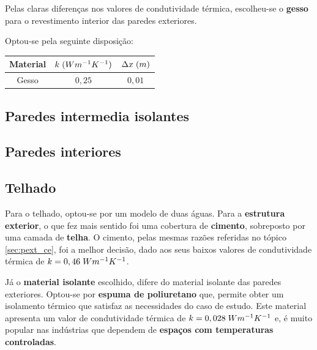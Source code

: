 \documentclass[12pt, a4paper]{article}
\begin{document}
Pelas claras diferenças nos valores de condutividade térmica, escolheu-se o \textbf{gesso} para o revestimento interior
das paredes exteriores.

Optou-se pela seguinte disposição:

\begin{center}
	\begin{tabular}{||c c c||}
		\hline
		Material & $k \hspace{1mm} (Wm^{-1}K^{-1})$ & $\Delta x \hspace{1mm} (m)$ \\ [0.5ex]
		\hline\hline
		Gesso    & $0,25$                           & $0,01$                      \\
		\hline
	\end{tabular}
\end{center}


\subsection{Paredes intermedia isolantes}\label{sub:Paredes intermedia isolantes}



\subsection{Paredes interiores}\label{sub:Paredes interiores}


\subsection{Telhado}\label{sub:Telhado}

Para o telhado, optou-se por um modelo de duas águas. Para a \textbf{estrutura exterior}, o que fez mais sentido foi
uma cobertura de \textbf{cimento}, sobreposto por uma camada de \textbf{telha}. O cimento, pelas mesmas razões referidas no tópico
\ref{sec:pext_ce}, foi a melhor decisão, dado aos seus baixos valores de condutividade térmica de $k=0,46 \hspace{1mm} Wm^{-1}K^{-1}$.

Já o \textbf{material isolante} escolhido, difere do material isolante das paredes exteriores. Optou-se
por \textbf{espuma de poliuretano} que, permite obter um isolamento térmico que satisfaz as necessidades
do caso de estudo. Este material apresenta um valor de condutividade térmica de
$k=0,028 \hspace{1mm} Wm^{-1}K^{-1}$ e, é muito popular nas indústrias que dependem de \textbf{espaços
	com temperaturas controladas}.
\end{document}

